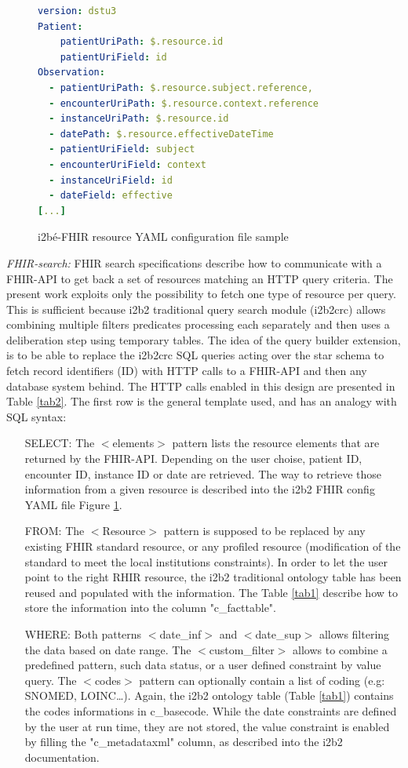 \documentclass{amia}
\newcommand{\remXavier}[1]{\todo[color=yellow]{[XT]{\scriptsize #1\par}}}
\begin{document}
\begin{figure}
\begin{lstlisting}[language=yaml]
version: dstu3
Patient:
    patientUriPath: $.resource.id
    patientUriField: id
Observation:
  - patientUriPath: $.resource.subject.reference,
  - encounterUriPath: $.resource.context.reference
  - instanceUriPath: $.resource.id
  - datePath: $.resource.effectiveDateTime
  - patientUriField: subject
  - encounterUriField: context
  - instanceUriField: id
  - dateField: effective
[...]
\end{lstlisting}
  \caption{i2bé-FHIR resource YAML configuration file sample}
	\label{conf1}
\end{figure}
\textit{FHIR-search:} FHIR search specifications describe how to communicate with a FHIR-API to get back a set of resources matching an HTTP query criteria. The present work exploits only the possibility to fetch one type of resource per query. This is sufficient because i2b2 traditional query search module (i2b2crc) allows combining multiple filters predicates processing each separately and then uses a deliberation step using temporary tables. The idea of the query builder extension, is to be able to replace the i2b2crc SQL queries acting over the star schema to fetch record identifiers (ID) with HTTP calls to a FHIR-API and then any database system behind. The HTTP calls enabled in this design are presented in Table \ref{tab2}. The first row is the general template used, and has an analogy with SQL syntax:
\begin{itemize}
	\item[SELECT:] The $<$elements$>$ pattern lists the resource elements that are returned by the FHIR-API. Depending on the user choise, patient ID, encounter ID, instance ID or date are retrieved. The way to retrieve those information from a given resource is described into the i2b2 FHIR config YAML file Figure \ref{conf1}.
	\item[FROM:] The $<$Resource$>$ pattern is supposed to be replaced by any existing FHIR standard resource, or any profiled resource (modification of the standard to meet the local institutions constraints). In order to let the user point to the right RHIR resource, the i2b2 traditional ontology table has been reused and populated with the information. The Table \ref{tab1} describe how to store the information into the column "c\_facttable".
	\item [WHERE:] Both patterns $<$date\_inf$>$ and $<$date\_sup$>$ allows filtering the data based on date range. The $<$custom\_filter$>$ allows to combine a predefined pattern, such data status, or a user defined constraint by value query. The $<$codes$>$ pattern can optionally contain a list of coding (e.g: SNOMED, LOINC\ldots). Again, the i2b2 ontology table (Table \ref{tab1}) contains the codes informations in c\_basecode. While the date constraints are defined by the user at run time, they are not stored, the value constraint is enabled by filling the "c\_metadataxml" column, as described into the i2b2 documentation.\remXavier{un peu trop détaillé ?}
\end{itemize}
\end{document}
